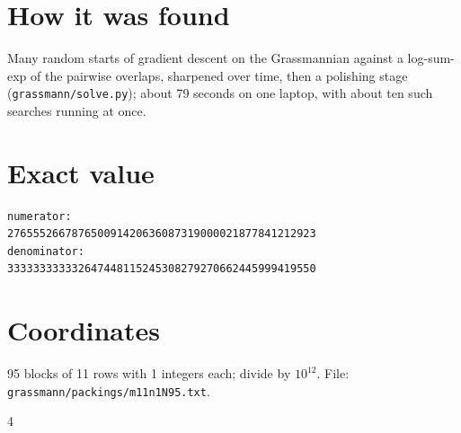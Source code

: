 \documentclass[11pt,a4paper]{article}
\begin{document}
\section{How it was found}
Many random starts of gradient descent on the Grassmannian against a log-sum-exp of the pairwise overlaps, sharpened over time, then a polishing stage (\texttt{grassmann/solve.py}); about 79 seconds on one laptop, with about ten such searches running at once.


\appendix
\section{Exact value}
{\small
\begin{verbatim}
numerator:
276555266787650091420636087319000021877841212923
denominator:
333333333332647448115245308279270662445999419550
\end{verbatim}}

\section{Coordinates}
95 blocks of 11 rows with 1 integers each; divide by $10^{12}$. File: \texttt{grassmann/packings/m11n1N95.txt}.
{\tiny
\begin{multicols}{4}
\end{multicols}}
\end{document}
